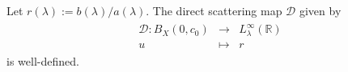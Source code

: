 \documentclass[../dissertation.tex]{subfiles}
\begin{document}




\begin{thm}\label{thm4:Dwelldefined}
	Let $r(\lambda) := b(\lambda) / a(\lambda)$. The direct scattering map
	$\mathscr D$ given by 
	\begin{align*}
		\begin{array}{rcl}
			\mathscr D: B_X(0, c_0) &\to& L_\lambda^\infty(\mathbb R)  \\
			            u           &\mapsto& r
		\end{array}
	\end{align*}
	is well-defined.
\end{thm}
\end{document}
